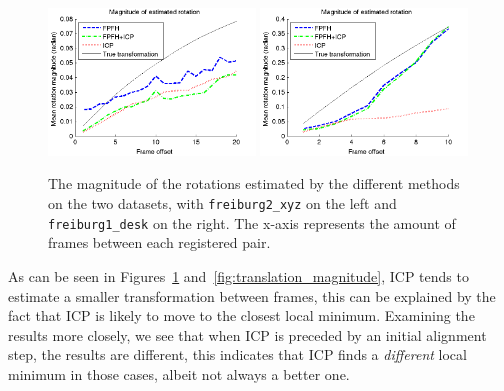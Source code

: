 \documentclass[a4paper]{article}
\begin{document}
\begin{figure}[H]
    \centering
        \includegraphics[width=0.49\textwidth]{ims/xyzMagnitudeofestimatedrotation.png}
        \includegraphics[width=0.49\textwidth]{ims/deskMagnitudeofestimatedrotation.png}
    \caption{The magnitude of the rotations estimated by the different methods on the two datasets, with \texttt{freiburg2\_xyz} on the left and \texttt{freiburg1\_desk} on the right. The x-axis represents the amount of frames between each registered pair.}
    \label{fig:rotation_magnitude}
\end{figure}

As can be seen in Figures~\ref{fig:rotation_magnitude} and~\ref{fig:translation_magnitude}, ICP tends to estimate a smaller transformation between frames, this can be explained by the fact that ICP is likely to move to the closest local minimum. Examining the results more closely, we see that when \ac{ICP} is preceded by an initial alignment step, the results are different, this indicates that \ac{ICP} finds a \emph{different} local minimum in those cases, albeit not always a better one.
\end{document}
